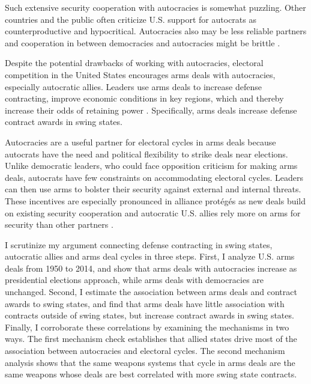 \documentclass[12pt]{article}
\begin{document}
Such extensive security cooperation with autocracies is somewhat puzzling.
Other countries and the public often criticize U.S. support for autocrats as counterproductive and hypocritical. 
Autocracies also may be less reliable partners \citep{Gaubatz1996} and cooperation in between democracies and autocracies might be brittle \citep{Leeds1999}. 


Despite the potential drawbacks of working with autocracies, electoral competition in the United States encourages arms deals with autocracies, especially autocratic allies.
Leaders use arms deals to increase defense contracting, improve economic conditions in key regions, which and thereby increase their odds of retaining power \citep{Tufte1978, Mintz1988, Mayer1995, DerouenHeo2000, Becker2021}. 
Specifically, arms deals increase defense contract awards in swing states. 


Autocracies are a useful partner for electoral cycles in arms deals because autocrats have the need and political flexibility to strike deals near elections. 
Unlike democratic leaders, who could face opposition criticism for making arms deals, autocrats have few constraints on accommodating electoral cycles.
Leaders can then use arms to bolster their security against external and internal threats.
These incentives are especially pronounced in alliance prot{\'e}g{\'e}s as new deals build on existing security cooperation and autocratic U.S. allies rely more on arms for security than other partners \citep{McManusYarhi-Milo2017}.


I scrutinize my argument connecting defense contracting in swing states, autocratic allies and arms deal cycles in three steps. 
First, I analyze U.S. arms deals from 1950 to 2014, and show that arms deals with autocracies increase as presidential elections approach, while arms deals with democracies are unchanged. 
Second, I estimate the association between arms deals and contract awards to swing states, and find that arms deals have little association with contracts outside of swing states, but increase contract awards in swing states. 
Finally, I corroborate these correlations by examining the mechanisms in two ways.
The first mechanism check establishes that allied states drive most of the association between autocracies and electoral cycles.
The second mechanism analysis shows that the same weapons systems that cycle in arms deals are the same weapons whose deals are best correlated with more swing state contracts.
\end{document}
